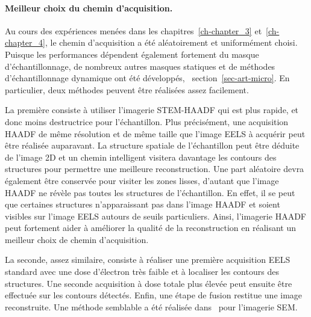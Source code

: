 \paragraph{Meilleur choix du chemin d'acquisition.} Au cours des expériences menées dans les chapitres~\ref{ch-chapter_3} et~\ref{ch-chapter_4}, le chemin d'acquisition a été aléatoirement et uniformément choisi. Puisque les performances dépendent également fortement du masque d'échantillonnage, de nombreux autres masques statiques et de méthodes d'échantillonnage dynamique ont été développés, \cf\ section~\ref{sec-art-micro}. En particulier, deux méthodes peuvent être réalisées assez facilement.

La première consiste à utiliser l'imagerie STEM-HAADF qui est plus rapide, et donc moins destructrice pour l'échantillon. Plus précisément, une acquisition HAADF de même résolution et de même taille que l'image EELS à acquérir peut être réalisée auparavant. La structure spatiale de l'échantillon peut être déduite de l'image 2D et un chemin intelligent visitera davantage les contours des structures pour permettre une meilleure reconstruction. Une part aléatoire devra également être conservée pour visiter les zones lisses, d'autant que l'image HAADF ne révèle pas toutes les structures de l'échantillon. En effet, il se peut que certaines structures n'apparaissant pas dans l'image HAADF et soient visibles sur l'image EELS autours de seuils particuliers. Ainsi, l'imagerie HAADF peut fortement aider à améliorer la qualité de la reconstruction en réalisant un meilleur choix de chemin d'acquisition.

La seconde, assez similaire, consiste à réaliser une première acquisition EELS standard avec une dose d'électron très faible et à localiser les contours des structures. Une seconde acquisition à dose totale plus élevée peut ensuite être effectuée sur les contours détectés. Enfin, une étape de fusion restitue une image reconstruite. Une méthode semblable a été réalisée dans~\cite{dahmen2016feature} pour l'imagerie SEM. 


